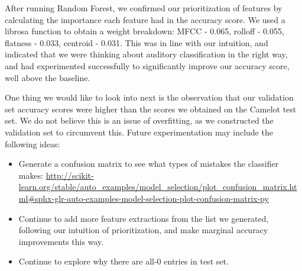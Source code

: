 \documentclass[11pt]{article}
\begin{document}
After running Random Forest, we confirmed our prioritization of features by calculating the importance each feature had in the accuracy score. We used a librosa function to obtain a weight breakdown: MFCC - 0.065, rolloff - 0.055, flatness - 0.033, centroid - 0.031. This was in line with our intuition, and indicated that we were thinking about auditory classification in the right way, and had experimented successfully to significantly improve our accuracy score, well above the baseline.

One thing we would like to look into next is the observation that our validation set accuracy scores were higher than the scores we obtained on the Camelot test set. We do not believe this is an issue of overfitting, as we constructed the validation set to circumvent this. Future experimentation may include the following ideas:
\begin{itemize}
    \item Generate a confusion matrix to see what types of mistakes the classifier makes:  \url{http://scikit-learn.org/stable/auto_examples/model_selection/plot_confusion_matrix.html#sphx-glr-auto-examples-model-selection-plot-confusion-matrix-py}
    \item Continue to add more feature extractions from the list we generated, following our intuition of prioritization, and make marginal accuracy improvements this way.
    \item Continue to explore why there are all-0 entries in test set.
\end{itemize}
 
\end{document}

